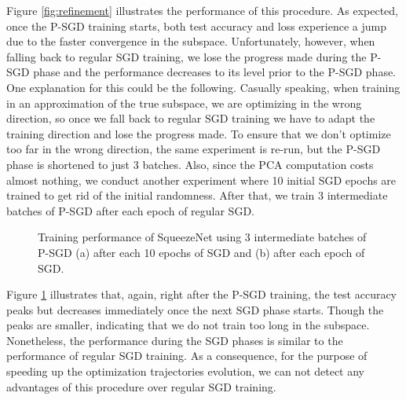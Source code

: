 \documentclass[11pt, a4paper]{article}
\begin{document}
Figure \ref{fig:refinement} illustrates the performance of this procedure. As expected, once the P-SGD training starts, both test accuracy and loss experience a jump due to the faster convergence in the subspace. Unfortunately, however, when falling back to regular SGD training, we lose the progress made during the P-SGD phase and the performance decreases to its level prior to the P-SGD phase. One explanation for this could be the following. Casually speaking, when training in an approximation of the true subspace, we are optimizing in the wrong direction, so once we fall back to regular SGD training we have to adapt the training direction and lose the progress made. To ensure that we don't optimize too far in the wrong direction, the same experiment is re-run, but the P-SGD phase is shortened to just 3 batches. Also, since the PCA computation costs almost nothing, we conduct another experiment where 10 initial SGD epochs are trained to get rid of the initial randomness. After that, we train 3 intermediate batches of P-SGD after each epoch of regular SGD.

\begin{figure}[!h]
\centering
{}
\parbox{14.5cm}{\centering \caption{\centering Training performance of SqueezeNet using 3 intermediate batches of P-SGD (a) after each 10 epochs of SGD and (b) after each epoch of SGD. \label{fig:refinement2}}}
\end{figure}

Figure \ref{fig:refinement2} illustrates that, again, right after the P-SGD training, the test accuracy peaks but decreases immediately once the next SGD phase starts. Though the peaks are smaller, indicating that we do not train too long in the subspace. Nonetheless, the performance during the SGD phases is similar to the performance of regular SGD training. As a consequence, for the purpose of speeding up the optimization trajectories evolution, we can not detect any advantages of this procedure over regular SGD training.
\end{document}
